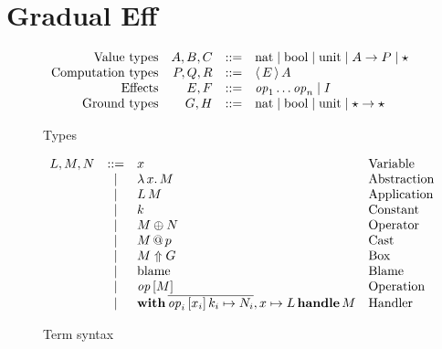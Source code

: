 \section{Gradual Eff}

\newcommand\ruledef{::=}
\newcommand\rulealt{\;|\;}
\newcommand\tyarr[2]{#1 \to #2}
\newcommand\tyany{\star}
\newcommand\cty[2]{\langle\,#1\,\rangle\,#2}
\newcommand\tynat{\mathrm{nat}}
\newcommand\tybool{\mathrm{bool}}
\newcommand\tyunit{\mathrm{unit}}
\newcommand\effany{\ding{73}}
\newcommand\effop{\mathit{op}}
\newcommand\app[2]{#1\,#2}
\newcommand\lam[2]{\lambda\, #1 .\, #2}
\newcommand\cast[2]{#1 \,\MVAt\, #2}
\newcommand\tbox[2]{#1 \Uparrow #2}
\newcommand\blame{\mathrm{blame}}
\newcommand\perform[2]{#1\left[#2\right]}
\newcommand\handle[2]{\mathbf{with}\,#1\,\mathbf{handle}\,#2}

\begin{figure}
$$
\begin{array}{rrcll}
 \text{Value types} & A, B, C & \ruledef & \tynat \rulealt \tybool \rulealt \tyunit \rulealt \tyarr{A}{P} \rulealt \tyany & \\
 \text{Computation types} & P, Q, R & \ruledef & \cty{E}{A} &  \\
 \text{Effects} & E, F & \ruledef & \effop_1 \dots \effop_n \rulealt \effany & \\
 \text{Ground types} & G, H & \ruledef & \tynat \rulealt \tybool \rulealt \tyunit \rulealt \tyarr{\tyany}{\tyany}
\end{array}
$$
\caption{Types}
\label{fig:types}
\end{figure}

\begin{figure}
$$
\begin{array}{rcll}
 L, M, N & \ruledef & x & \text{Variable} \\
         & \rulealt & \lam{x}{M} & \text{Abstraction} \\
         & \rulealt & \app{L}{M} & \text{Application} \\
         & \rulealt & k & \text{Constant} \\
         & \rulealt & M \oplus N & \text{Operator} \\
         & \rulealt & \cast{M}{p} & \text{Cast} \\
         & \rulealt & \tbox{M}{G} & \text{Box} \\
         & \rulealt & \blame & \text{Blame} \\
         & \rulealt & \perform{\effop}{M} & \text{Operation} \\
         & \rulealt & \handle{\overline{\perform{\effop_i}{x_i} k_i \mapsto N_i}, x \mapsto L}{M} & \text{Handler}
\end{array}
$$
\caption{Term syntax}
\label{fig:term-syntax}
\end{figure}

